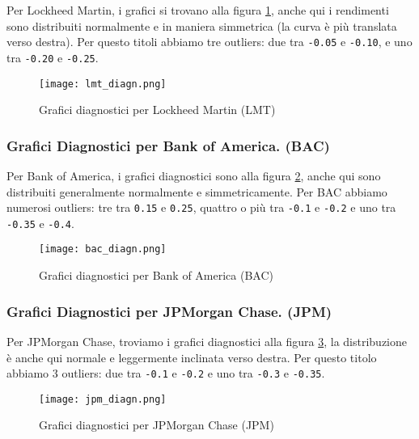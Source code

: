 Per Lockheed Martin, i grafici si trovano alla figura \ref{fig:lmt_diagn}, anche qui i rendimenti sono distribuiti normalmente e in maniera simmetrica (la curva è più translata verso destra).
Per questo titoli abbiamo tre outliers: due tra \verb|-0.05| e \verb|-0.10|, e uno tra \verb|-0.20| e \verb|-0.25|.

\vspace{3cm}

\begin{figure}[h]
  \centering
  \texttt{[image: lmt\_diagn.png]}
  \caption{Grafici diagnostici per Lockheed Martin (LMT)}
  \label{fig:lmt_diagn}
\end{figure}

\pagebreak

\subsubsection{Grafici Diagnostici per Bank of America. (BAC)}

Per Bank of America, i grafici diagnostici sono alla figura \ref{fig:bac_diagn}, anche qui sono distribuiti generalmente normalmente e simmetricamente.
Per BAC abbiamo numerosi outliers: tre tra \verb|0.15| e \verb|0.25|, quattro o più tra \verb|-0.1| e \verb|-0.2| e uno tra \verb|-0.35| e \verb|-0.4|.

\vspace{3cm}

\begin{figure}[h]
  \centering
  \texttt{[image: bac\_diagn.png]}
  \caption{Grafici diagnostici per Bank of America (BAC)}
  \label{fig:bac_diagn}
\end{figure}

\pagebreak

\subsubsection{Grafici Diagnostici per JPMorgan Chase. (JPM)}

Per JPMorgan Chase, troviamo i grafici diagnostici alla figura \ref{fig:jpm_diagn}, la distribuzione è anche qui normale e leggermente inclinata verso destra.
Per questo titolo abbiamo 3 outliers: due tra \verb|-0.1| e \verb|-0.2| e uno tra \verb|-0.3| e \verb|-0.35|.

\vspace{3cm}

\begin{figure}[h]
  \centering
  \texttt{[image: jpm\_diagn.png]}
  \caption{Grafici diagnostici per JPMorgan Chase (JPM)}
  \label{fig:jpm_diagn}
\end{figure}

